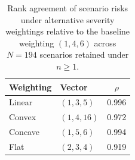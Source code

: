 \begin{table}[t]
  \centering
  \caption{Rank agreement of scenario risks under alternative severity weightings relative to the baseline weighting $(1,4,6)$ across $N = 194$ scenarios retained under $n \ge 1$.}
  \label{tab:severity_sens}
  \begin{tabular}{llS[table-format=1.3]}
    \toprule
    Weighting & Vector & {$\rho$} \\
    \midrule
    Linear & $(1,3,5)$ & 0.996 \\
    Convex & $(1,4,16)$ & 0.972 \\
    Concave & $(1,5,6)$ & 0.994 \\
    Flat & $(2,3,4)$ & 0.919 \\
    \bottomrule
  \end{tabular}
\end{table}
